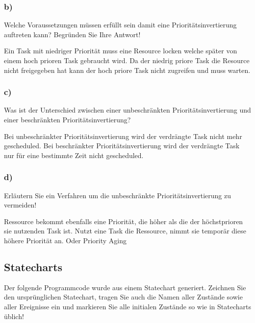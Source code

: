 \subsubsection{b)}
Welche Voraussetzungen müssen erfüllt sein damit eine Prioritätsinvertierung auftreten kann?
Begründen Sie Ihre Antwort!

Ein Task mit niedriger Priorität muss eine Resource locken welche später von einem hoch prioren Task gebraucht wird. 
Da der niedrig priore Task die Resource nicht freigegeben hat kann der hoch priore Task nicht zugreifen und muss warten.

\subsubsection{c)}
Was ist der Unterschied zwischen einer unbeschränkten Prioritätsinvertierung und einer beschränkten
Prioritätsinvertierung?

Bei unbeschränkter Prioritätsinvertierung wird der verdrängte Task nicht mehr gescheduled. Bei beschränkter Prioritätsinvertierung
wird der verdrängte Task nur für eine bestimmte Zeit nicht gescheduled.

\subsubsection{d)}
Erläutern Sie ein Verfahren um die unbeschränkte Prioritätsinvertierung zu vermeiden!

Ressource bekommt ebenfalls eine Priorität, die höher als die der höchstprioren sie nutzenden Task ist.
Nutzt eine Task die Ressource, nimmt sie temporär diese höhere Priorität an. Oder Priority Aging

\subsection{Statecharts}
Der folgende Programmcode wurde aus einem Statechart generiert. Zeichnen Sie den ursprünglichen
Statechart, tragen Sie auch die Namen aller Zustände sowie aller Ereignisse ein und markieren Sie alle
initialen Zustände so wie in Statecharts üblich!

